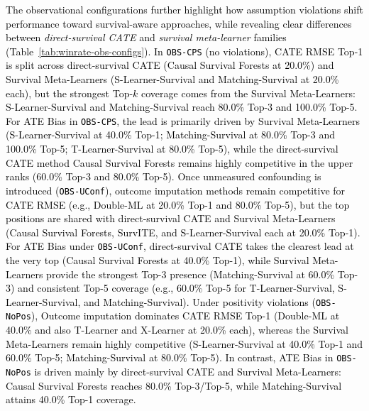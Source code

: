 \documentclass{article} %
\newcommand{\rebuttal}[1]{\textcolor{black}{#1}}
\begin{document}
\rebuttal{The observational configurations further highlight how assumption violations shift performance toward survival-aware approaches, while revealing clear differences between \emph{direct-survival CATE} and \emph{survival meta-learner} families (Table~\ref{tab:winrate-obs-configs}). In \texttt{OBS-CPS} (no violations), CATE RMSE Top-1 is split across direct-survival CATE (Causal Survival Forests at 20.0\%) and Survival Meta-Learners (S-Learner-Survival and Matching-Survival at 20.0\% each), but the strongest Top-$k$ coverage comes from the Survival Meta-Learners: S-Learner-Survival and Matching-Survival reach 80.0\% Top-3 and 100.0\% Top-5. For ATE Bias in \texttt{OBS-CPS}, the lead is primarily driven by Survival Meta-Learners (S-Learner-Survival at 40.0\% Top-1; Matching-Survival at 80.0\% Top-3 and 100.0\% Top-5; T-Learner-Survival at 80.0\% Top-5), while the direct-survival CATE method Causal Survival Forests remains highly competitive in the upper ranks (60.0\% Top-3 and 80.0\% Top-5). Once unmeasured confounding is introduced (\texttt{OBS-UConf}), outcome imputation methods remain competitive for CATE RMSE (e.g., Double-ML at 20.0\% Top-1 and 80.0\% Top-5), but the top positions are shared with direct-survival CATE and Survival Meta-Learners (Causal Survival Forests, SurvITE, and S-Learner-Survival each at 20.0\% Top-1). For ATE Bias under \texttt{OBS-UConf}, direct-survival CATE takes the clearest lead at the very top (Causal Survival Forests at 40.0\% Top-1), while Survival Meta-Learners provide the strongest Top-3 presence (Matching-Survival at 60.0\% Top-3) and consistent Top-5 coverage (e.g., 60.0\% Top-5 for T-Learner-Survival, S-Learner-Survival, and Matching-Survival). Under positivity violations (\texttt{OBS-NoPos}), Outcome imputation dominates CATE RMSE Top-1 (Double-ML at 40.0\% and also T-Learner and X-Learner at 20.0\% each), whereas the Survival Meta-Learners remain highly competitive (S-Learner-Survival at 40.0\% Top-1 and 60.0\% Top-5; Matching-Survival at 80.0\% Top-5). In contrast, ATE Bias in \texttt{OBS-NoPos} is driven mainly by direct-survival CATE and Survival Meta-Learners: Causal Survival Forests reaches 80.0\% Top-3/Top-5, while Matching-Survival attains 40.0\% Top-1 coverage.}
\end{document}

